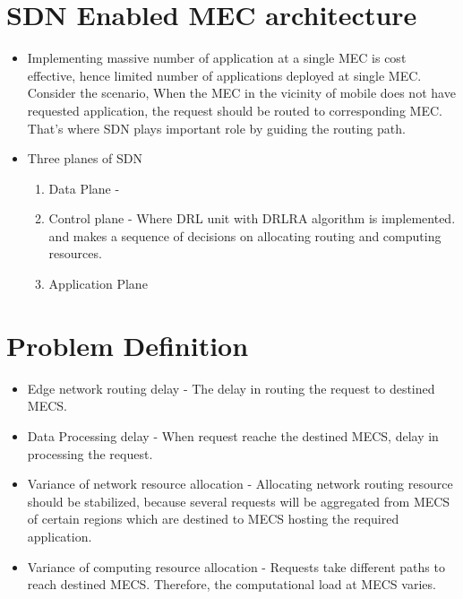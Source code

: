 \section{SDN Enabled MEC architecture}
\label{sec:SDN Enabled MEC architecture}
\begin{itemize}
    \item Implementing massive number of application at a single MEC is cost effective, hence limited number of applications deployed at single MEC. Consider the scenario, When the MEC in the vicinity of mobile does not have requested application, the request should be routed to corresponding MEC. That's where SDN plays important role by guiding the routing path.
    \item Three planes of SDN
    \begin{enumerate}
        \item Data Plane - 
        \item Control plane - Where DRL unit with DRLRA algorithm is implemented. and makes a sequence of decisions on allocating routing and computing resources.
        \item Application Plane
        
    \end{enumerate}
\end{itemize}

\section{Problem Definition}
\label{sec:Problem Definition}
\begin{itemize}
\item {Edge network routing delay} - The delay in routing the request to destined MECS.
\item {Data Processing delay } - When request reache the destined MECS, delay in processing the request.
\item{Variance of network resource allocation} - Allocating network routing resource should be stabilized, because several requests will be aggregated from MECS of certain regions which are destined to MECS hosting the required application.
\item{Variance of computing resource allocation} - Requests take different paths to reach destined MECS. Therefore, the computational load at MECS varies.
\end{itemize}

